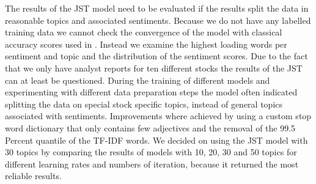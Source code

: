 The results of the JST model need to be evaluated if the results split the data in reasonable topics and associated sentiments. Because we do not have any labelled training data we cannot check the convergence of the model with classical accuracy scores used in \citet{lin2009joint}. Instead we examine the highest loading words per sentiment and topic and the distribution of the sentiment scores. Due to the fact that we only have analyst reports for ten different stocks the results of the JST can at least be questioned. During the training of different models and experimenting with different data preparation steps the model often indicated splitting the data on special stock specific topics, instead of general topics associated with sentiments. Improvements where achieved by using a custom stop word dictionary that only contains few adjectives and the removal of the 99.5 Percent quantile of the TF-IDF words. We decided on using the JST model with 30 topics by comparing the results of models with 10, 20, 30 and 50 topics for different learning rates and numbers of iteration, because it returned the most reliable results. \\

